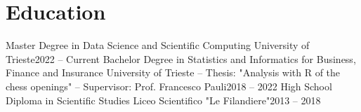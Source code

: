 \section{\textbf{Education}}
  \resumeSubHeadingListStart
    \resumeSubheading
      {Master Degree in Data Science and Scientific Computing}{}  
      {University of Trieste}{2022 -- Current}
    \resumeSubheading
      {Bachelor Degree in Statistics and Informatics for Business, Finance and Insurance}{}   %
      {University of Trieste -- Thesis: "Analysis with R of the chess openings" -- Supervisor: Prof. Francesco Pauli}{2018 -- 2022}{}
    \resumeSubheading
      {High School Diploma in Scientific Studies}{}   
      {Liceo Scientifico "Le Filandiere"}{2013 -- 2018}
  \resumeSubHeadingListEnd